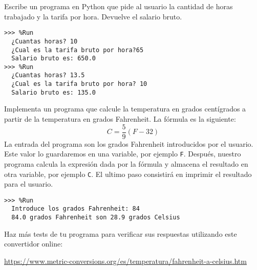 \begin{ejercicio}Escribe un programa en Python que pide al usuario la cantidad de horas trabajado y la tarifa por hora. Devuelve el salario bruto.\\

\begin{Verbatim}[frame=single, label={\em ejemplos y posibles test de ejecución}]
>>> %Run
  ¿Cuantas horas? 10
  ¿Cual es la tarifa bruto por hora?65
  Salario bruto es: 650.0
>>> %Run
  ¿Cuantas horas? 13.5
  ¿Cual es la tarifa bruto por hora? 10
  Salario bruto es: 135.0
\end{Verbatim}
\end{ejercicio}


\begin{ejercicio}Implementa un programa que calcule la temperatura en grados centígrados a partir de la temperatura en grados Fahrenheit. La fórmula es la siguiente: 
\begin{displaymath}
  C = \frac{5}{9}(F-32)
\end{displaymath} 
La entrada del programa son los grados Fahrenheit introducidos por el usuario. Este valor lo guardaremos en una variable, por ejemplo \verb+F+. Después, nuestro programa calcula la expresión dada por la fórmula y almacena el resultado en otra variable, por ejemplo \verb+C+. El ultimo paso consistirá en imprimir el resultado para el usuario.\\

\begin{Verbatim}[frame=single, label={\em ejemplo de ejecución}]
>>> %Run 
  Introduce los grados Fahrenheit: 84
  84.0 grados Fahrenheit son 28.9 grados Celsius
\end{Verbatim}

Haz más tests de tu programa para verificar sus respuestas utilizando este convertidor online:

\url{https://www.metric-conversions.org/es/temperatura/fahrenheit-a-celsius.htm}


\end{ejercicio}

